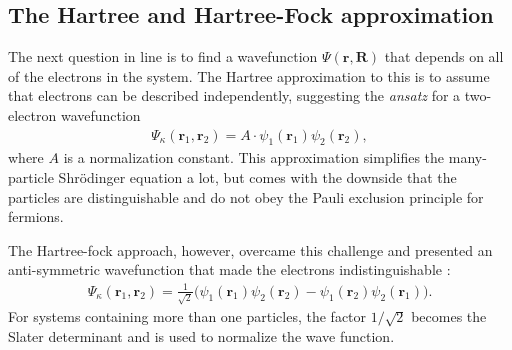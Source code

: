 \subsection{The Hartree and Hartree-Fock approximation}

The next question in line is to find a wavefunction $\Psi(\boldsymbol{r},\boldsymbol{R})$ that depends on all of the electrons in the system. The Hartree \cite{Persson2020, DavidSholl2009} approximation to this is to assume that electrons can be described independently, suggesting the \textit{ansatz} for a two-electron wavefunction
\begin{align}
  \Psi_\kappa(\boldsymbol{r}_1,\boldsymbol{r}_2) = A \cdot \psi_1(\boldsymbol{r}_1) \psi_2(\boldsymbol{r}_2),
\end{align}
where $A$ is a normalization constant. This approximation simplifies the many-particle Shrödinger equation a lot, but comes with the downside that the particles are distinguishable and do not obey the Pauli exclusion principle for fermions.

The Hartree-fock approach, however, overcame this challenge and presented an anti-symmetric wavefunction that made the electrons indistinguishable \cite{Griffiths2017}:
\begin{align}
  \Psi_\kappa(\boldsymbol{r}_1,\boldsymbol{r}_2) = \frac{1}{\sqrt{2}}\Big( \psi_1(\boldsymbol{r}_1) \psi_2(\boldsymbol{r}_2)  - {\psi_1(\boldsymbol{r}_2)\psi_2(\boldsymbol{r}_1)}\Big).
\end{align}
For systems containing more than one particles, the factor $1/\sqrt{2}$ becomes the Slater determinant and is used to normalize the wave function.


